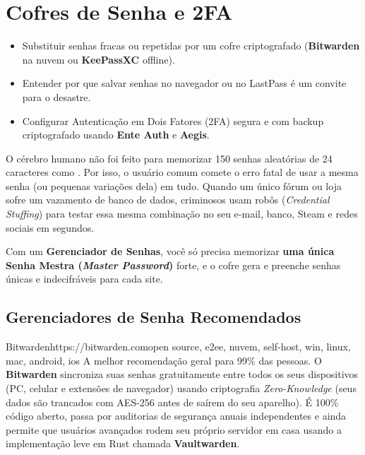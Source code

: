 \documentclass{pousadaguide}
\begin{document}
\chapter{Cofres de Senha e 2FA}

\begin{missao}
\begin{itemize}
  \item Substituir senhas fracas ou repetidas por um cofre criptografado (\textbf{Bitwarden} na nuvem ou \textbf{KeePassXC} offline).
  \item Entender por que salvar senhas no navegador ou no LastPass é um convite para o desastre.
  \item Configurar Autenticação em Dois Fatores (2FA) segura e com backup criptografado usando \textbf{Ente Auth} e \textbf{Aegis}.
\end{itemize}
\end{missao}

O cérebro humano não foi feito para memorizar 150 senhas aleatórias de 24 caracteres como . Por isso, o usuário comum comete o erro fatal de usar a mesma senha (ou pequenas variações dela) em tudo. Quando um único fórum ou loja sofre um vazamento de banco de dados, criminosos usam robôs (\emph{Credential Stuffing}) para testar essa mesma combinação no seu e-mail, banco, Steam e redes sociais em segundos.

Com um \textbf{Gerenciador de Senhas}, você só precisa memorizar \textbf{uma única Senha Mestra (\emph{Master Password})} forte, e o cofre gera e preenche senhas únicas e indecifráveis para cada site.

\section{Gerenciadores de Senha Recomendados}

\begin{ferramenta}[goat,logo=bitwarden]{Bitwarden}{https://bitwarden.com}{open source, e2ee, nuvem, self-host, win, linux, mac, android, ios}
A melhor recomendação geral para 99\% das pessoas. O \textbf{Bitwarden} sincroniza suas senhas gratuitamente entre todos os seus dispositivos (PC, celular e extensões de navegador) usando criptografia \emph{Zero-Knowledge} (seus dados são trancados com AES-256 antes de saírem do seu aparelho). É 100\% código aberto, passa por auditorias de segurança anuais independentes e ainda permite que usuários avançados rodem seu próprio servidor em casa usando a implementação leve em Rust chamada \textbf{Vaultwarden}. 
\end{ferramenta}
\end{document}
